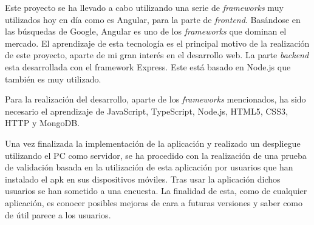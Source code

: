 \documentclass[a4paper, 12pt]{book}
\begin{document}
Este proyecto se ha llevado a cabo utilizando una serie de \emph{frameworks} muy utilizados hoy en d\'ia como es Angular, para la parte de \emph{frontend}. Bas\'andose en las b\'usquedas de Google, Angular es uno de los \emph{frameworks} que dominan el mercado. El aprendizaje de esta tecnolog\'ia es el principal motivo de la realizaci\'on de este proyecto, aparte de mi gran inter\'es en el desarrollo web. La parte \emph{backend} esta desarrollada con el framework Express. Este est\'a basado en Node.js que tambi\'en es muy utilizado.

Para la realizaci\'on del desarrollo, aparte de los \emph{frameworks} mencionados, ha sido necesario el aprendizaje de JavaScript, TypeScript, Node.js, HTML5, CSS3, HTTP y MongoDB.

Una vez finalizada la implementaci\'on de la aplicaci\'on y realizado un despliegue utilizando el PC como servidor, se ha procedido con la realizaci\'on de una prueba de validaci\'on basada en la utilizaci\'on de esta aplicaci\'on por usuarios que han instalado el apk en sus dispositivos m\'oviles. Tras usar la aplicaci\'on dichos usuarios se han sometido a una encuesta. La finalidad de esta, como de cualquier aplicaci\'on, es conocer posibles mejoras de cara a futuras versiones y saber como de \'util parece a los usuarios.








\tableofcontents 
\cleardoublepage
\listoffigures %


\end{document}
